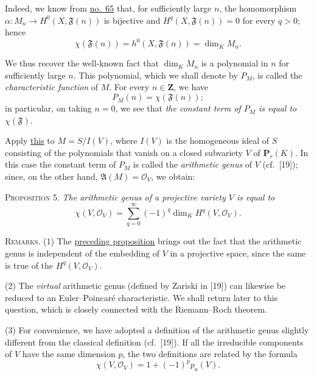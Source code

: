 Indeed, we know from \hyperref[fac:III:3:no:65]{no.~65} that, for
sufficiently large $n$, the homomorphism
$\alpha:M_n\to H^0(X,\mathfrak F(n))$ is bijective and
$H^q(X,\mathfrak F(n))=0$ for every $q>0$; hence
\[
\chi(\mathfrak F(n))=h^0(X,\mathfrak F(n))=\dim_K M_n.
\]

We thus recover the well-known fact that $\dim_K M_n$ is a polynomial
in $n$ for sufficiently large $n$. This polynomial, which we shall
denote by $P_M$, is called the
\label{fac:III:6:no:80:def:characteristic-function}
\textit{characteristic function} of $M$. For every $n\in\mathbf Z$,
we have
\label{fac:III:6:no:80:formula:P-M}
\[
P_M(n)=\chi(\mathfrak F(n));
\]
in particular, on taking $n=0$, we see that
\textit{the constant term of $P_M$ is equal to $\chi(\mathfrak F)$}.

Apply \hyperref[fac:III:6:no:80:prop:4]{this} to $M=S/I(V)$, where $I(V)$ is the homogeneous ideal of $S$
consisting of the polynomials that vanish on a closed subvariety $V$
of $\mathbf P_r(K)$. In this case the constant term of $P_M$ is called
the \label{fac:III:6:no:80:def:arithmetic-genus}
\textit{arithmetic genus} of $V$ (cf.~[19]); since, on the other hand,
$\mathfrak A(M)=\mathcal O_V$, we obtain:

\label{fac:III:6:no:80:prop:5}
\textsc{Proposition 5.} \textit{The arithmetic genus of a projective
variety $V$ is equal to}
\label{fac:III:6:no:80:prop:5:formula}
\[
\chi(V,\mathcal O_V)=\sum_{q=0}^{\infty}(-1)^q
 \dim_K H^q(V,\mathcal O_V).
\]

\textsc{Remarks}. \label{fac:III:6:no:80:remark:1}
(1) The \hyperref[fac:III:6:no:80:prop:5]{preceding proposition} brings out the fact that the arithmetic
genus is independent of the embedding of $V$ in a projective space,
since the same is true of the $H^q(V,\mathcal O_V)$.

\label{fac:III:6:no:80:remark:2}
(2) The \textit{virtual} arithmetic genus (defined by Zariski in [19])
can likewise be reduced to an Euler--Poincaré characteristic. We shall
return later to this question, which is closely connected with the
Riemann--Roch theorem.

\label{fac:III:6:no:80:remark:3}
(3) For convenience, we have adopted a definition of the arithmetic
genus slightly different from the classical definition (cf.~[19]). If
all the irreducible components of $V$ have the same dimension $p$, the
two definitions are related by the formula
\label{fac:III:6:no:80:remark:3:formula}
\[
\chi(V,\mathcal O_V)=1+(-1)^p p_a(V).
\]
